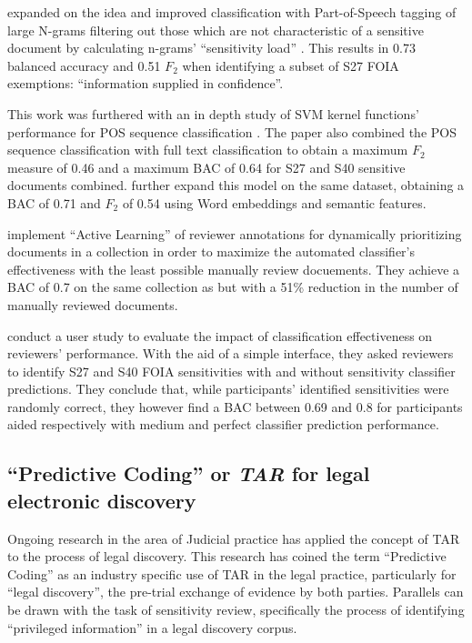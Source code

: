 \documentclass[\version]{l4proj}
\begin{document}
\textcite{mcdonaldUsingPartofSpeechNgrams2015} expanded on the idea and improved classification with Part-of-Speech tagging of large N-grams filtering out those which are not characteristic of a sensitive document by calculating n-grams' ``sensitivity load'' \autocite[2]{mcdonaldUsingPartofSpeechNgrams2015}.
This results in 0.73 balanced accuracy and 0.51 \(F_{2}\) when identifying a subset of S27 FOIA exemptions: ``information supplied in confidence''.

This work was furthered with an in depth study of SVM kernel functions' performance for POS sequence classification \autocite{mcdonaldStudySVMKernel2017}.
The paper also combined the POS sequence classification with full text classification to obtain a maximum \(F_{2}\) measure of 0.46 and a maximum BAC of 0.64 for S27 and S40 sensitive documents combined.
\autocite{mcdonaldEnhancingSensitivityClassification2017} further expand this model on the same dataset, obtaining a BAC of 0.71 and \(F_{2}\) of 0.54 using Word embeddings and semantic features.

\textcite{mcdonaldActiveLearningStrategies2018} implement ``Active Learning'' of reviewer annotations for dynamically prioritizing documents in a collection in order to maximize the automated classifier's effectiveness with the least possible manually review docuements.
They achieve a BAC of 0.7 on the same collection as \textcite{mcdonaldStudySVMKernel2017,mcdonaldEnhancingSensitivityClassification2017} but with a 51\% reduction in the number of manually reviewed documents.

\textcite{mcdonaldHowSensitivityClassification2019} conduct a user study to evaluate the impact of classification effectiveness on reviewers' performance. With the aid of a simple interface, they asked reviewers to identify S27 and S40 FOIA sensitivities with and without sensitivity classifier predictions.
They conclude that, while participants' identified sensitivities were randomly correct, they however find a BAC between 0.69 and 0.8 for participants aided respectively with medium and perfect classifier prediction performance.

\subsection{``Predictive Coding'' or \textit{TAR} for legal electronic discovery}

Ongoing research in the area of Judicial practice has applied the concept of TAR to the process of legal discovery.
This research has coined the term ``Predictive Coding'' \autocite{carrollGrossmancormackGlossaryTechnologyassisted2013} as an industry specific use of TAR in the legal practice, particularly for ``legal discovery'', the pre-trial exchange of evidence by both parties.
Parallels can be drawn with the task of sensitivity review, specifically the process of identifying ``privileged information'' in a legal discovery corpus.
\end{document}
